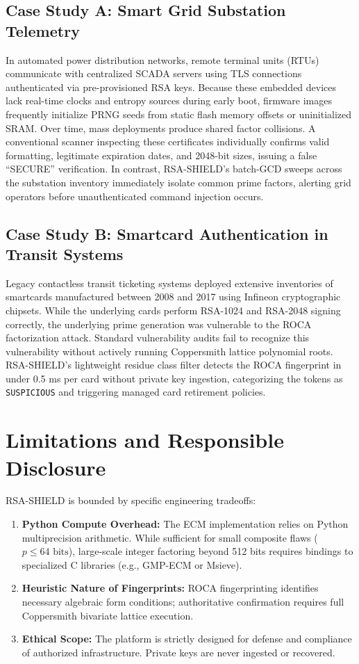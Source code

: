 \documentclass[sigconf,nonacm]{acmart}
\begin{document}
\subsection{Case Study A: Smart Grid Substation Telemetry}
In automated power distribution networks, remote terminal units (RTUs) communicate with centralized SCADA servers using TLS connections authenticated via pre-provisioned RSA keys. Because these embedded devices lack real-time clocks and entropy sources during early boot, firmware images frequently initialize PRNG seeds from static flash memory offsets or uninitialized SRAM. Over time, mass deployments produce shared factor collisions. A conventional scanner inspecting these certificates individually confirms valid formatting, legitimate expiration dates, and 2048-bit sizes, issuing a false ``SECURE'' verification. In contrast, RSA-SHIELD's batch-GCD sweeps across the substation inventory immediately isolate common prime factors, alerting grid operators before unauthenticated command injection occurs.

\subsection{Case Study B: Smartcard Authentication in Transit Systems}
Legacy contactless transit ticketing systems deployed extensive inventories of smartcards manufactured between 2008 and 2017 using Infineon cryptographic chipsets. While the underlying cards perform RSA-1024 and RSA-2048 signing correctly, the underlying prime generation was vulnerable to the ROCA factorization attack. Standard vulnerability audits fail to recognize this vulnerability without actively running Coppersmith lattice polynomial roots. RSA-SHIELD's lightweight residue class filter detects the ROCA fingerprint in under 0.5 ms per card without private key ingestion, categorizing the tokens as \texttt{SUSPICIOUS} and triggering managed card retirement policies.

\section{Limitations and Responsible Disclosure}
RSA-SHIELD is bounded by specific engineering tradeoffs:
\begin{enumerate}
    \item \textbf{Python Compute Overhead:} The ECM implementation relies on Python multiprecision arithmetic. While sufficient for small composite flaws ($p \le 64\text{ bits}$), large-scale integer factoring beyond 512 bits requires bindings to specialized C libraries (e.g., GMP-ECM or Msieve).
    \item \textbf{Heuristic Nature of Fingerprints:} ROCA fingerprinting identifies necessary algebraic form conditions; authoritative confirmation requires full Coppersmith bivariate lattice execution.
    \item \textbf{Ethical Scope:} The platform is strictly designed for defense and compliance of authorized infrastructure. Private keys are never ingested or recovered.
\end{enumerate}
\end{document}
